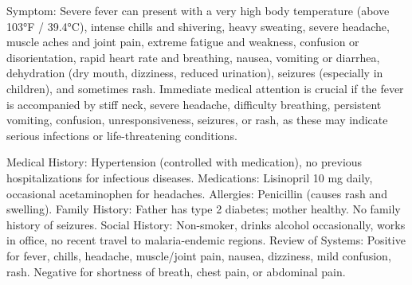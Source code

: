 Symptom:
Severe fever can present with a very high body temperature (above 103°F / 39.4°C), intense chills and shivering, heavy sweating, severe headache, muscle aches and joint pain, extreme fatigue and weakness, confusion or disorientation, rapid heart rate and breathing, nausea, vomiting or diarrhea, dehydration (dry mouth, dizziness, reduced urination), seizures (especially in children), and sometimes rash. Immediate medical attention is crucial if the fever is accompanied by stiff neck, severe headache, difficulty breathing, persistent vomiting, confusion, unresponsiveness, seizures, or rash, as these may indicate serious infections or life-threatening conditions.

Medical History:
Hypertension (controlled with medication), no previous hospitalizations for infectious diseases.
Medications: Lisinopril 10 mg daily, occasional acetaminophen for headaches.
Allergies: Penicillin (causes rash and swelling).
Family History: Father has type 2 diabetes; mother healthy. No family history of seizures.
Social History: Non-smoker, drinks alcohol occasionally, works in office, no recent travel to malaria-endemic regions.
Review of Systems: Positive for fever, chills, headache, muscle/joint pain, nausea, dizziness, mild confusion, rash. Negative for shortness of breath, chest pain, or abdominal pain.